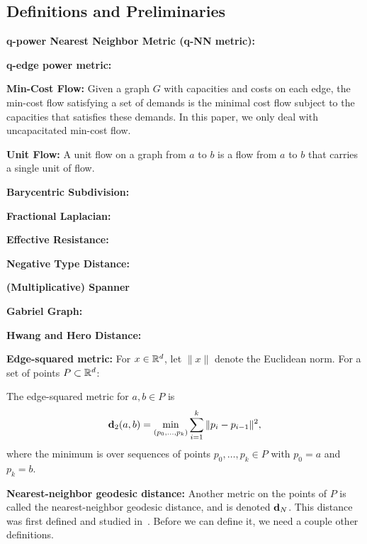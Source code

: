 
\subsection{Definitions and Preliminaries} %
\label{sec:definitions}
\noindent \textbf{q-power Nearest Neighbor Metric (q-NN metric):}

\noindent \textbf{q-edge power metric:}

\noindent \textbf{Min-Cost Flow:} Given a graph $G$ with capacities and
costs on each edge, the min-cost flow satisfying a set of demands is the
minimal cost flow subject to the capacities that satisfies these demands.
In this paper, we only deal with uncapacitated min-cost flow.

\noindent \textbf{Unit Flow:} A unit flow on a graph from $a$ to $b$ is a
flow from $a$ to $b$ that carries a single unit of flow.

\noindent \textbf{Barycentric Subdivision:}

\noindent \textbf{Fractional Laplacian:}

\noindent \textbf{Effective Resistance:}

\noindent \textbf{Negative Type Distance:}

\noindent \textbf{(Multiplicative) Spanner}

\noindent \textbf{Gabriel Graph:}

\noindent \textbf{Hwang and Hero Distance:}

\noindent \textbf{Edge-squared metric:}  For $x\in \mathbb{R}^d$, let $\|x\|$ denote the Euclidean norm.
  For a set of points $P\subset \mathbb{R}^d$:

  \begin{definition}
  The edge-squared metric for $a,b\in P$ is
  \[
    \mathbf{d}_2(a,b) = \min_{(p_0,\ldots, p_k)}\sum_{i=1}^k \|p_i - p_{i-1}\|^2,
  \]
  where the minimum is over sequences of points $p_0,\ldots, p_k\in P$ with $p_0 = a$ and $p_k = b$.
  \end{definition}

\vspace{3 mm}
\noindent \textbf{Nearest-neighbor geodesic distance:}
  Another metric on the points of $P$ is called the nearest-neighbor
  geodesic distance, and is denoted $\mathbf{d}_N$.
This distance was first defined and studied
  in~\cite{cohen15approximating}.
  Before we can define it, we need a couple other definitions.

